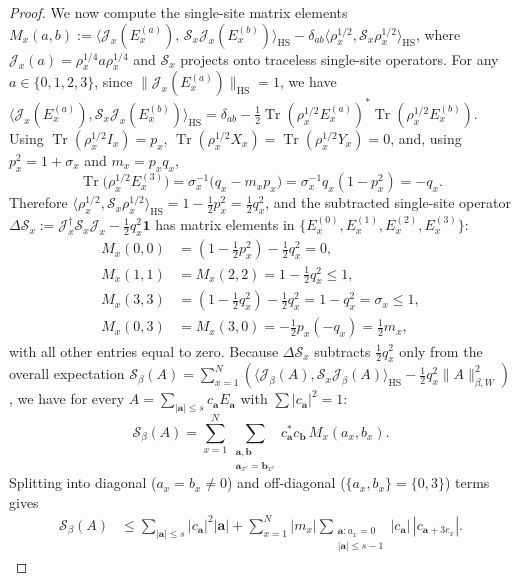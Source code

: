 \documentclass[11pt,a4paper]{article}
\numberwithin{equation}{section}
\theoremstyle{plain}
\theoremstyle{definition}
\newcommand{\HS}{\mathrm{HS}}
\newcommand{\Tr}{\operatorname{Tr}}
\begin{document}
\begin{proof}
We now compute the single-site matrix elements $M_x(a,b) := \langle\mathcal{J}_x(E_x^{(a)}),\,\mathcal{S}_x\mathcal{J}_x(E_x^{(b)})\rangle_\HS - \delta_{ab}\langle\rho_x^{1/2},\mathcal{S}_x\rho_x^{1/2}\rangle_\HS$, where $\mathcal{J}_x(a) = \rho_x^{1/4}a\rho_x^{1/4}$ and $\mathcal{S}_x$ projects onto traceless single-site operators. For any $a\in\{0,1,2,3\}$, since $\|\mathcal{J}_x(E_x^{(a)})\|_\HS = 1$, we have $\langle\mathcal{J}_x(E_x^{(a)}),\mathcal{S}_x\mathcal{J}_x(E_x^{(b)})\rangle_\HS = \delta_{ab} - \frac{1}{2}\Tr(\rho_x^{1/2}E_x^{(a)})^*\Tr(\rho_x^{1/2}E_x^{(b)})$. Using $\Tr(\rho_x^{1/2}I_x) = p_x$, $\Tr(\rho_x^{1/2}X_x) = \Tr(\rho_x^{1/2}Y_x) = 0$, and, using $p_x^2 = 1 + \sigma_x$ and $m_x = p_x q_x$,
\[
  \Tr\bigl(\rho_x^{1/2}E_x^{(3)}\bigr) = \sigma_x^{-1}\bigl(q_x - m_x p_x\bigr)
  = \sigma_x^{-1} q_x(1 - p_x^2) = -q_x.
\]
Therefore $\langle\rho_x^{1/2},\mathcal{S}_x\rho_x^{1/2}\rangle_\HS = 1 - \frac{1}{2}p_x^2 = \frac{1}{2}q_x^2$, and the subtracted single-site operator $\Delta\mathcal{S}_x := \mathcal{J}_x^\dagger\mathcal{S}_x\mathcal{J}_x - \frac{1}{2}q_x^2\mathbf{1}$ has matrix elements in $\{E_x^{(0)}, E_x^{(1)}, E_x^{(2)}, E_x^{(3)}\}$:
\begin{align*}
  M_x(0,0) &= \left(1 - \frac{1}{2}p_x^2\right) - \frac{1}{2}q_x^2 = 0, \\
  M_x(1,1) &= M_x(2,2) = 1 - \frac{1}{2}q_x^2 \le 1, \\
  M_x(3,3) &= \left(1 - \frac{1}{2}q_x^2\right) - \frac{1}{2}q_x^2 = 1 - q_x^2 = \sigma_x \le 1, \\
  M_x(0,3) &= M_x(3,0) = -\frac{1}{2}p_x(-q_x) = \frac{1}{2}m_x,
\end{align*}
with all other entries equal to zero. Because $\Delta\mathcal{S}_x$ subtracts $\frac{1}{2}q_x^2$ only from the overall expectation $\mathcal{S}_\beta(A) = \sum_{x=1}^N (\langle\mathcal{J}_\beta(A),\mathcal{S}_x\mathcal{J}_\beta(A)\rangle_\HS - \frac{1}{2}q_x^2\|A\|_{\beta,W}^2)$, we have for every $A = \sum_{|\mathbf{a}|\le s} c_{\mathbf{a}} E_{\mathbf{a}}$ with $\sum |c_{\mathbf{a}}|^2 = 1$:
\[
  \mathcal{S}_\beta(A)
  = \sum_{x=1}^N \sum_{\substack{\mathbf{a},\mathbf{b} \\ \mathbf{a}_{x^c}=\mathbf{b}_{x^c}}} c_{\mathbf{a}}^* c_{\mathbf{b}}\, M_x(a_x, b_x).
\]
Splitting into diagonal ($a_x = b_x \ne 0$) and off-diagonal ($\{a_x,b_x\}=\{0,3\}$) terms gives
\begin{align*}
  \mathcal{S}_\beta(A)
  &\le \sum_{|\mathbf{a}|\le s} |c_{\mathbf{a}}|^2 |\mathbf{a}|
    + \sum_{x=1}^N |m_x| \sum_{\substack{\mathbf{a}: a_x=0 \\ |\mathbf{a}|\le s-1}} |c_{\mathbf{a}}|\,|c_{\mathbf{a}+3e_x}|.

\end{align*}
\end{proof}
\end{document}
